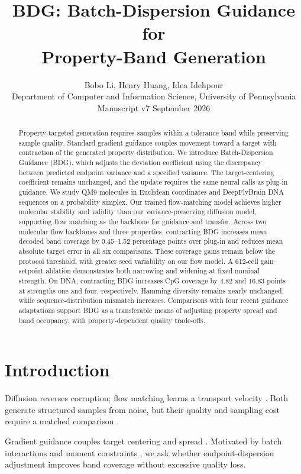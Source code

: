 \documentclass{article}
\title{BDG: Batch-Dispersion Guidance for\\Property-Band Generation}
\author{Bobo Li, Henry Huang, Idea Idehpour\\
Department of Computer and Information Science, University of Pennsylvania\\
\small Manuscript v7 \quad 28 September 2026}
\begin{document}
\maketitle
\begin{abstract}
Property-targeted generation requires samples within a tolerance band while preserving sample quality. Standard gradient guidance couples movement toward a target with contraction of the generated property distribution. We introduce Batch-Dispersion Guidance (BDG), which adjusts the deviation coefficient using the discrepancy between predicted endpoint variance and a specified variance. The target-centering coefficient remains unchanged, and the update requires the same neural calls as plug-in guidance. We study QM9 molecules in Euclidean coordinates and DeepFlyBrain DNA sequences on a probability simplex. Our trained flow-matching model achieves higher molecular stability and validity than our variance-preserving diffusion model, supporting flow matching as the backbone for guidance and transfer. Across two molecular flow backbones and three properties, contracting BDG increases mean decoded band coverage by 0.45--1.52 percentage points over plug-in and reduces mean absolute target error in all six comparisons. These coverage gains remain below the protocol threshold, with greater seed variability on our flow model. A 612-cell gain--setpoint ablation demonstrates both narrowing and widening at fixed nominal strength. On DNA, contracting BDG increases CpG coverage by 4.82 and 16.83 points at strengths one and four, respectively. Hamming diversity remains nearly unchanged, while sequence-distribution mismatch increases. Comparisons with four recent guidance adaptations support BDG as a transferable means of adjusting property spread and band occupancy, with property-dependent quality trade-offs.
\end{abstract}

\section{Introduction}
Diffusion reverses corruption; flow matching learns a transport velocity \citep{karras2022elucidating,lipman2022flow}. Both generate structured samples from noise, but their quality and sampling cost require a matched comparison \citep{albergo2025stochastic}.

Gradient guidance couples target centering and spread \citep{chung2023dps,song2023lgd}. Motivated by batch interactions and moment constraints \citep{corso2024particle,mgd2026moment}, we ask whether endpoint-dispersion adjustment improves band coverage without excessive quality loss.
\end{document}
